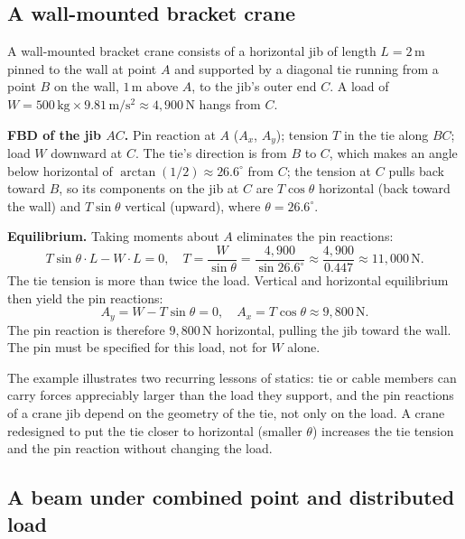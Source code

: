 \subsection{A wall-mounted bracket crane}

A wall-mounted bracket crane consists of a horizontal jib of length
$L = 2\,\si{\meter}$ pinned to the wall at point $A$ and supported
by a diagonal tie running from a point $B$ on the wall, $1\,\si{
\meter}$ above $A$, to the jib's outer end $C$. A load of $W =
500\,\si{\kilogram} \times 9.81 \,\si{\meter\per\second\squared}
\approx 4{,}900\,\text{N}$ hangs from $C$.



\textbf{FBD of the jib $AC$.} Pin reaction at $A$ ($A_x$, $A_y$);
tension $T$ in the tie along $BC$; load $W$ downward at $C$. The
tie's direction is from $B$ to $C$, which makes an angle below
horizontal of $\arctan(1/2) \approx 26.6^{\circ}$ from $C$; the
tension at $C$ pulls back toward $B$, so its components on the jib
at $C$ are $T \cos\theta$ horizontal (back toward the wall) and
$T \sin\theta$ vertical (upward), where $\theta = 26.6^{\circ}$.

\textbf{Equilibrium.} Taking moments about $A$ eliminates the pin
reactions:
\[
T \sin\theta \cdot L - W \cdot L = 0, \quad
T = \frac{W}{\sin\theta} = \frac{4{,}900}{\sin 26.6^{\circ}}
\approx \frac{4{,}900}{0.447} \approx 11{,}000\,\text{N}.
\]
The tie tension is more than twice the load. Vertical and horizontal
equilibrium then yield the pin reactions:
\[
A_y = W - T \sin\theta = 0, \quad
A_x = T \cos\theta \approx 9{,}800\,\text{N}.
\]
The pin reaction is therefore $9{,}800\,\text{N}$ horizontal, pulling
the jib toward the wall. The pin must be specified for this load,
not for $W$ alone.

The example illustrates two recurring lessons of statics: tie or
cable members can carry forces appreciably larger than the load they
support, and the pin reactions of a crane jib depend on the geometry
of the tie, not only on the load. A crane redesigned to put the tie
closer to horizontal (smaller $\theta$) increases the tie tension
and the pin reaction without changing the load.

\subsection{A beam under combined point and distributed load}


